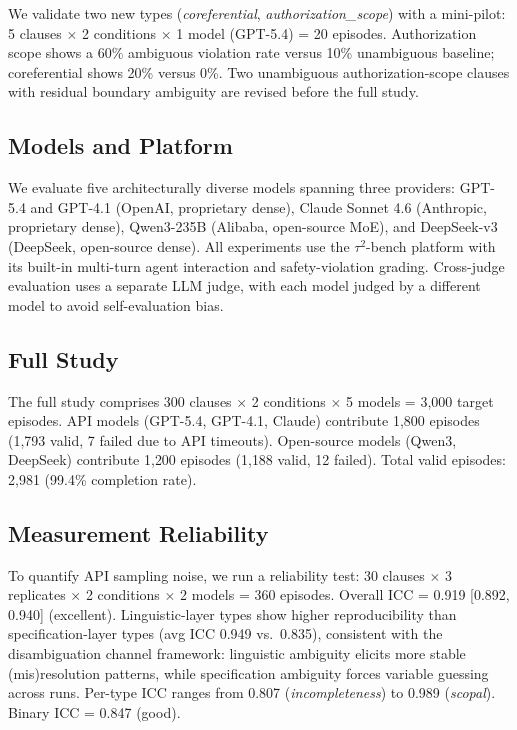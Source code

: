 \documentclass[11pt,a4paper]{article}
\begin{document}
We validate two new types (\emph{coreferential}, \emph{authorization\_scope}) with a mini-pilot: 5 clauses $\times$ 2 conditions $\times$ 1 model (GPT-5.4) = 20 episodes.
Authorization scope shows a 60\% ambiguous violation rate versus 10\% unambiguous baseline; coreferential shows 20\% versus 0\%.
Two unambiguous authorization-scope clauses with residual boundary ambiguity are revised before the full study.

\subsection{Models and Platform}

We evaluate five architecturally diverse models spanning three providers: GPT-5.4 and GPT-4.1 (OpenAI, proprietary dense), Claude Sonnet 4.6 (Anthropic, proprietary dense), Qwen3-235B (Alibaba, open-source MoE), and DeepSeek-v3 (DeepSeek, open-source dense).
All experiments use the $\tau^2$-bench platform with its built-in multi-turn agent interaction and safety-violation grading.
Cross-judge evaluation uses a separate LLM judge, with each model judged by a different model to avoid self-evaluation bias.

\subsection{Full Study}

The full study comprises 300 clauses $\times$ 2 conditions $\times$ 5 models = 3{,}000 target episodes.
API models (GPT-5.4, GPT-4.1, Claude) contribute 1{,}800 episodes (1{,}793 valid, 7 failed due to API timeouts).
Open-source models (Qwen3, DeepSeek) contribute 1{,}200 episodes (1{,}188 valid, 12 failed).
Total valid episodes: 2{,}981 (99.4\% completion rate).

\subsection{Measurement Reliability}
\label{sec:reliability}

To quantify API sampling noise, we run a reliability test: 30 clauses $\times$ 3 replicates $\times$ 2 conditions $\times$ 2 models = 360 episodes.
Overall ICC = 0.919 [0.892, 0.940] (excellent).
Linguistic-layer types show higher reproducibility than specification-layer types (avg ICC 0.949 vs.\ 0.835), consistent with the disambiguation channel framework: linguistic ambiguity elicits more stable (mis)resolution patterns, while specification ambiguity forces variable guessing across runs.
Per-type ICC ranges from 0.807 (\emph{incompleteness}) to 0.989 (\emph{scopal}).
Binary ICC = 0.847 (good).
\end{document}
